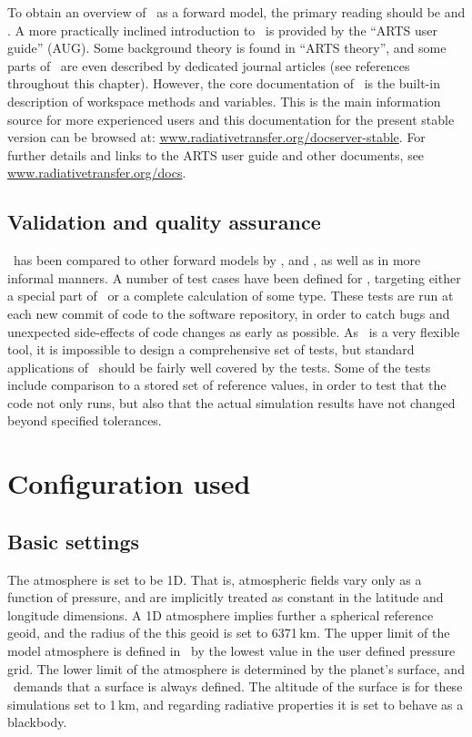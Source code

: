 To obtain an overview of \ARTS\ as a forward model, the primary reading should
be \citet{buehler:artst:05} and \citet{eriksson:arts2:11}. A more practically
inclined introduction to \ARTS\ is provided by the ``ARTS user guide'' (AUG).
Some background theory is found in ``ARTS theory'', and some parts of \ARTS\
are even described by dedicated journal articles (see references throughout
this chapter). However, the core documentation of \ARTS\ is the built-in
description of workspace methods and variables. This is the main information
source for more experienced users and this documentation for the present stable
version can be browsed at: \url{www.radiativetransfer.org/docserver-stable}.
For further details and links to the ARTS user guide and other
documents, see \url{www.radiativetransfer.org/docs}.



\subsection{Validation and quality assurance}
%
\ARTS\ has been compared to other forward models by
\citet{melsheimer:inter:05}, \citet{buehler2006radiative} and
\citet{saunders07:_atmos_infrar_sound_airs_jgr}, as well as in more informal
manners. A number of test cases have been defined for \ARTS, targeting either a
special part of \ARTS\ or a complete calculation of some type. These tests are
run at each new commit of code to the software repository, in order to catch
bugs and unexpected side-effects of code changes as early as possible. As
\ARTS\ is a very flexible tool, it is impossible to design a comprehensive set
of tests, but standard applications of \ARTS\ should be fairly well covered by
the tests. Some of the tests include comparison to a stored set of reference
values, in order to test that the code not only runs, but also that the actual
simulation results have not changed beyond specified tolerances.


\section{Configuration used}
\label{sec:arts:config}

\subsection{Basic settings}
%
The atmosphere is set to be 1D. That is, atmospheric fields vary only as a
function of pressure, and are implicitly treated as constant in the latitude
and longitude dimensions. A 1D atmosphere implies further a spherical reference
geoid, and the radius of the this geoid is set to 6371\,km. The upper limit of
the model atmosphere is defined in \ARTS\ by the lowest value in the user
defined pressure grid.  The lower limit of the atmosphere is determined by the
planet's surface, and \ARTS\ demands that a surface is always defined. The
altitude of the surface is for these simulations set to 1\,km, and regarding
radiative properties it is set to behave as a blackbody.

